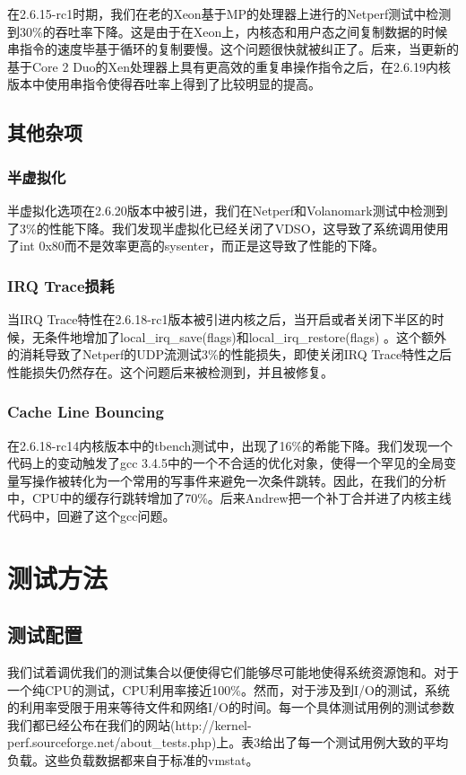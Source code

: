 在2.6.15-rc1时期，我们在老的Xeon基于MP的处理器上进行的Netperf测试中检测到30\%的吞吐率下降。这是由于在Xeon上，内核态和用户态之间复制数据的时候串指令的速度毕基于循环的复制要慢。这个问题很快就被纠正了。后来，当更新的基于Core 2 Duo的Xen处理器上具有更高效的重复串操作指令之后，在2.6.19内核版本中使用串指令使得吞吐率上得到了比较明显的提高。

\subsection{其他杂项}
\subsubsection{半虚拟化}
半虚拟化选项在2.6.20版本中被引进，我们在Netperf和Volanomark测试中检测到了3\%的性能下降。我们发现半虚拟化已经关闭了VDSO，这导致了系统调用使用了int 0x80而不是效率更高的sysenter，而正是这导致了性能的下降。
\subsubsection{IRQ  Trace损耗}
当IRQ Trace特性在2.6.18-rc1版本被引进内核之后，当开启或者关闭下半区的时候，无条件地增加了local\_irq\_save(flags)和local\_irq\_restore(flags) 。这个额外的消耗导致了Netperf的UDP流测试3\%的性能损失，即使关闭IRQ Trace特性之后性能损失仍然存在。这个问题后来被检测到，并且被修复。
\subsubsection{Cache Line Bouncing}
在2.6.18-rc14内核版本中的tbench测试中，出现了16\%的希能下降。我们发现一个代码上的变动触发了gcc 3.4.5中的一个不合适的优化对象，使得一个罕见的全局变量写操作被转化为一个常用的写事件来避免一次条件跳转。因此，在我们的分析中，CPU中的缓存行跳转增加了70\%。后来Andrew把一个补丁合并进了内核主线代码中，回避了这个gcc问题。


\section{测试方法}
\subsection{测试配置}
我们试着调优我们的测试集合以便使得它们能够尽可能地使得系统资源饱和。对于一个纯CPU的测试，CPU利用率接近100\%。然而，对于涉及到I/O的测试，系统的利用率受限于用来等待文件和网络I/O的时间。每一个具体测试用例的测试参数我们都已经公布在我们的网站(http://kernel-perf.sourceforge.net/about\_tests.php)上。表3给出了每一个测试用例大致的平均负载。这些负载数据都来自于标准的vmstat。


